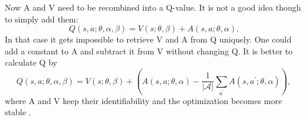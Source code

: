 \documentclass[12pt]{article}
\begin{document}
Now A and V need to be recombined into a Q-value. It is not a good idea though to simply add them:
\begin{equation}
Q(s, a ; \theta, \alpha, \beta)=V(s ; \theta, \beta)+A(s, a ; \theta, \alpha).
\end{equation}
In that case it gets impossible to retrieve V and A from Q uniquely. One could add a constant to A and subtract it from V without changing Q.
It is better to calculate Q by
\begin{equation}
Q(s, a ; \theta, \alpha, \beta)=V(s ; \theta, \beta)+ \left(A(s, a ; \theta, \alpha)-\frac{1}{|\mathcal{A}|} \sum_{a^{\prime}} A\left(s, a^{\prime} ; \theta, \alpha\right)\right),
\end{equation}
where A and V keep their identifiability and the optimization becomes more stable \cite{DBLP:journals/corr/WangFL15}.
\end{document}
